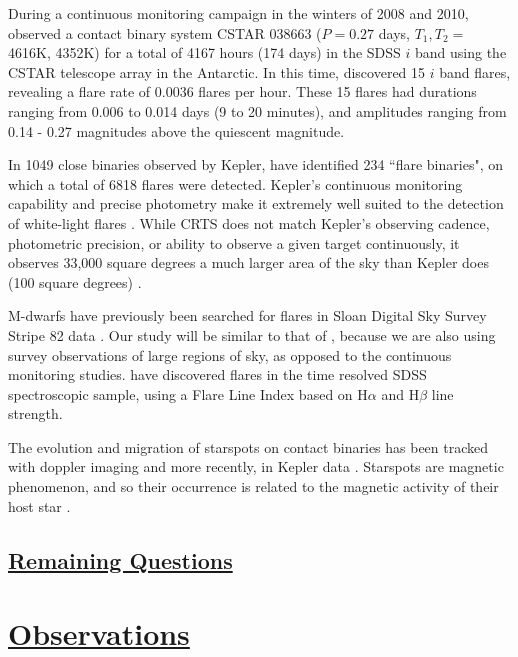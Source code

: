 \documentclass[12pt]{article} %
\numberwithin{equation}{section} %
\begin{document}
During a continuous monitoring campaign in the winters of 2008 and 2010, \citet{qian2014optical} observed a contact binary system CSTAR 038663 ($P = 0.27$ days, $T_{1}, T_{2} =$ 4616K, 4352K) for a total of 4167 hours (174 days) in the SDSS $i$ band using the CSTAR telescope array in the Antarctic. In this time, \citet{qian2014optical} discovered 15 $i$ band flares, revealing a flare rate of $0.0036$ flares per hour. These 15 flares had durations ranging from 0.006 to 0.014 days (9 to 20 minutes), and amplitudes ranging from 0.14 - 0.27 magnitudes above the quiescent magnitude.

In 1049 close binaries observed by Kepler, \citet{gao2016white} have identified 234 ``flare binaries", on which a total of 6818 flares were detected. Kepler's continuous monitoring capability and precise photometry make it extremely well suited to the detection of white-light flares \citep{walkowicz2011white}. While CRTS does not match Kepler's observing cadence, photometric precision, or ability to observe a given target continuously, it observes 33,000 square degrees a much larger area of the sky than Kepler does (100 square degrees) \citep{drake2009first, basri2005kepler}.

M-dwarfs have previously been searched for flares in Sloan Digital Sky Survey Stripe 82 data \citep{kowalski2009m}. Our study will be similar to that of \citet{kowalski2009m}, because we are also using survey observations of large regions of sky, as opposed to the continuous monitoring studies. \citet{hilton2010m} have discovered flares in the time resolved SDSS spectroscopic sample, using a Flare Line Index based on H$\alpha$ and H$\beta$ line strength.

The evolution and migration of starspots on contact binaries has been tracked with doppler imaging \citep{hendry2000doppler} and more recently, in Kepler data \citep{tran2013anticorrelated, balaji2015tracking}. Starspots are magnetic phenomenon, and so their occurrence is related to the magnetic activity of their host star \citep{berdyugina2005starspots}.  

\subsection[Remaining Questions]{\hyperlink{toc}{Remaining Questions}} \label{sec: Remaining Questions}

\section[Observations]{\hyperlink{toc}{Observations}} \label{sec: observations}
\end{document}
